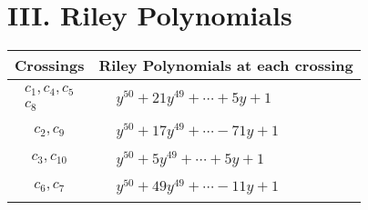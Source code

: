 \documentclass[1p]{elsarticle_modified}
\theoremstyle{definition}
\begin{document}
\centering \section*{ III. Riley Polynomials}
\begin{tabular}{m{50pt}|m{274pt}}
Crossings & \hspace{64pt}Riley Polynomials at each crossing \\
\hline $$\begin{aligned}c_{1},c_{4},c_{5}\\c_{8}\end{aligned}$$&$\begin{aligned}
&y^{50}+21 y^{49}+\cdots+5 y+1
\end{aligned}$\\
\hline $$\begin{aligned}c_{2},c_{9}\end{aligned}$$&$\begin{aligned}
&y^{50}+17 y^{49}+\cdots-71 y+1
\end{aligned}$\\
\hline $$\begin{aligned}c_{3},c_{10}\end{aligned}$$&$\begin{aligned}
&y^{50}+5 y^{49}+\cdots+5 y+1
\end{aligned}$\\
\hline $$\begin{aligned}c_{6},c_{7}\end{aligned}$$&$\begin{aligned}
&y^{50}+49 y^{49}+\cdots-11 y+1
\end{aligned}$\\
\hline
\end{tabular}
\vskip 2pc
\end{document}
